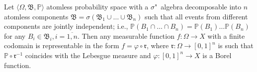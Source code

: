 \begin{lemma} \label{lemma:consp}
	Let $\langle \Omega, \mathfrak{B}, \mathbb{P} \rangle$ atomless probability space with a $\sigma$"~algebra decomposable into $n$ atomless components $\mathfrak{B} = \sigma(\mathfrak{B}_1 \cup \ldots \cup \mathfrak{B}_n)$ such that all events from different components are jointly independent; i.e., $\mathbb{P}(B_1 \cap \ldots \cap B_n) = \mathbb{P}(B_1) \ldots \mathbb{P}(B_n)$ for any $B_i \in \mathfrak{B}_i, i=\overline{1,n}$. Then any measurable function $f : \Omega \rightarrow X$ with a finite codomain is representable in the form $f = \varphi \circ \mathfrak{r}$, where $\mathfrak{r} : \Omega \rightarrow [0,1]^n$ is such that $\mathbb{P} \circ \mathfrak{r}^{-1}$ coincides with the Lebesgue measure and $\varphi : [0,1]^n \rightarrow X$ is a Borel function. %
\end{lemma}

